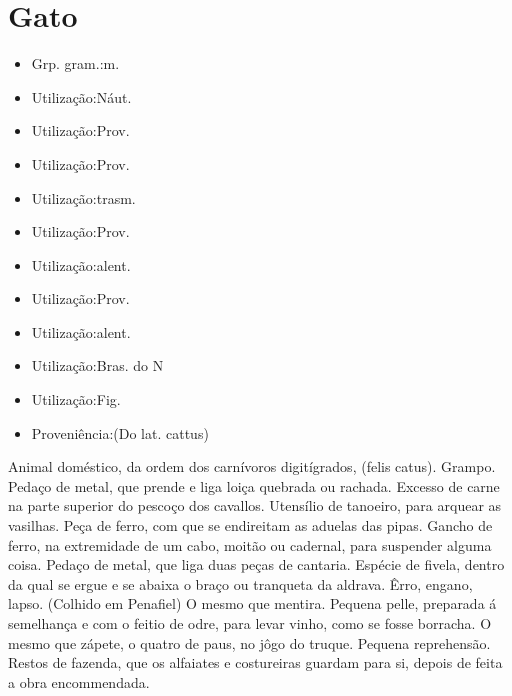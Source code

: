 \section{Gato}
\begin{itemize}
\item {Grp. gram.:m.}
\end{itemize}
\begin{itemize}
\item {Utilização:Náut.}
\end{itemize}
\begin{itemize}
\item {Utilização:Prov.}
\end{itemize}
\begin{itemize}
\item {Utilização:Prov.}
\end{itemize}
\begin{itemize}
\item {Utilização:trasm.}
\end{itemize}
\begin{itemize}
\item {Utilização:Prov.}
\end{itemize}
\begin{itemize}
\item {Utilização:alent.}
\end{itemize}
\begin{itemize}
\item {Utilização:Prov.}
\end{itemize}
\begin{itemize}
\item {Utilização:alent.}
\end{itemize}
\begin{itemize}
\item {Utilização:Bras. do N}
\end{itemize}
\begin{itemize}
\item {Utilização:Fig.}
\end{itemize}
\begin{itemize}
\item {Proveniência:(Do lat. \textunderscore cattus\textunderscore )}
\end{itemize}
Animal doméstico, da ordem dos carnívoros digitígrados, (\textunderscore felis catus\textunderscore ).
Grampo.
Pedaço de metal, que prende e liga loiça quebrada ou rachada.
Excesso de carne na parte superior do pescoço dos cavallos.
Utensílio de tanoeiro, para arquear as vasilhas.
Peça de ferro, com que se endireitam as aduelas das pipas.
Gancho de ferro, na extremidade de um cabo, moitão ou cadernal, para suspender alguma coisa.
Pedaço de metal, que liga duas peças de cantaria.
Espécie de fivela, dentro da qual se ergue e se abaixa o braço ou tranqueta da aldrava.
Êrro, engano, lapso. (Colhido em Penafiel)
O mesmo que \textunderscore mentira\textunderscore .
Pequena pelle, preparada á semelhança e com o feitio de odre, para levar vinho, como se fosse borracha.
O mesmo que \textunderscore zápete\textunderscore , o quatro de paus, no jôgo do truque.
Pequena reprehensão.
Restos de fazenda, que os alfaiates e costureiras guardam para si, depois de feita a obra encommendada.
